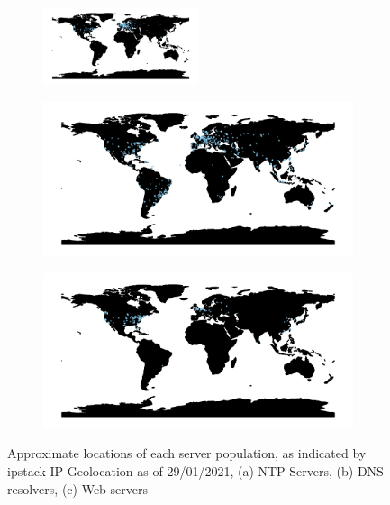 \documentclass{l4proj}
\begin{document}
\begin{figure}[H]
    \centering
    
    \begin{subfigure}[b]{\textwidth}
         \centering
         \includegraphics[width=0.5\textwidth]{dissertation/images/ntp.locs.map.pdf}
         \caption{}
     \end{subfigure}
     
     \centering
\begin{subfigure}{.5\textwidth}
  \centering
  \includegraphics[width=\linewidth]{dissertation/images/dns.locs.map.pdf}
  \caption{}
  \label{fig:sub1}
\end{subfigure}%
\begin{subfigure}{.5\textwidth}
  \centering
  \includegraphics[width=\linewidth]{dissertation/images/web.locs.map.pdf}
  \caption{}
  \label{fig:sub2}
\end{subfigure}
\caption{Approximate locations of each server population, as indicated by ipstack IP Geolocation as of 29/01/2021, (a) NTP Servers, (b) DNS resolvers, (c) Web servers}
\label{fig:locs}
  
\end{figure}
\end{document}
